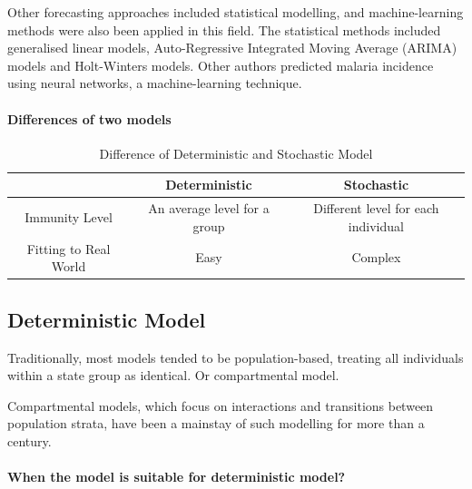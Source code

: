 \documentclass[a4paper, 12pt, twoside]{article}
\begin{document}
Other forecasting approaches included statistical modelling, and machine-learning methods were also been applied in this field.
The statistical methods included generalised linear models, Auto-Regressive Integrated Moving Average (ARIMA) models\cite{box2015time} and Holt-Winters models\cite{Chatfield1978}.
Other authors\cite{Toh2021a,Libbrecht2015,Nkiruka2021,Verma2020,Kim2019,Khameneh2014,Ebhuoma2018,Hancock2020} predicted malaria incidence using neural networks, a machine-learning technique.

\paragraph{Differences of two models}%
\label{par:differences_of_two_models}

\begin{table}[ht]
	\centering
	\label{tab:difference}
	\begin{tabular}{c c c}
		\toprule
		                      & Deterministic                & Stochastic                          \\
		\midrule
		Immunity Level        & An average level for a group & Different level for each individual \\
		Fitting to Real World & Easy                         & Complex                             \\
		\bottomrule
	\end{tabular}
	\caption{Difference of Deterministic and Stochastic Model}
\end{table}

\subsection{Deterministic Model}

Traditionally, most models tended to be population-based, treating all individuals within a state group as identical.
Or compartmental model.

Compartmental models, which focus on interactions and transitions between population strata, have been a mainstay of such modelling for more than a century.


\paragraph{When the model is suitable for deterministic model?}%
\label{par:when_the_model_is_suitable_for_deterministic_model_}
\end{document}
